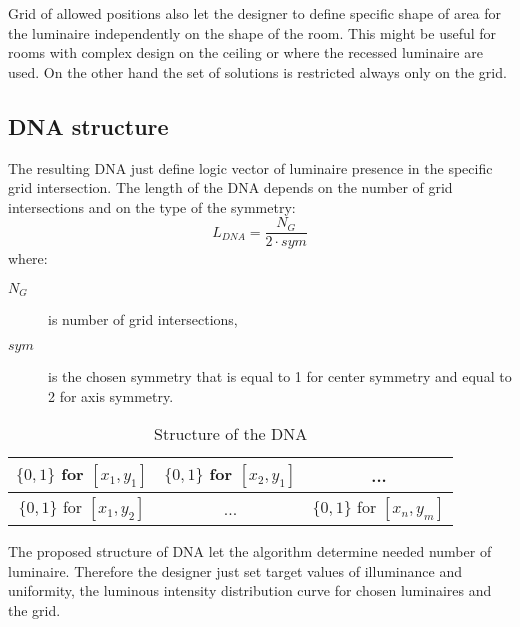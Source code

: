 Grid of allowed positions also let the designer to define specific shape of area for the luminaire independently on the shape of the room. This might be useful for rooms with complex design on the ceiling or where the recessed luminaire are used. On the other hand the set of solutions is restricted always only on the grid.

\subsection{DNA structure}
\label{ssec:dnaStruc}
The resulting DNA just define logic vector of luminaire presence in the specific grid intersection. The length of the DNA depends on the number of grid intersections and on the type of the symmetry:
\begin{equation}
\label{eq:DNALength}
L_{DNA} = \frac{N_G}{2\cdot sym}
\end{equation}
where:
\begin{description}
	\item[$N_G$] is number of grid intersections,
	\item[$sym$] is the chosen symmetry that is equal to 1 for center symmetry and equal to 2 for axis symmetry.
\end{description}

\begin{table}[htb]
	\renewcommand{\arraystretch}{1.3}
	\caption{Structure of the DNA}
 	\label{tab:onesideLamps}
	\centering
  \begin{tabular}{| c | c | c |}
    \hline
    $\lbrace0,1\rbrace$ for $[x_1,y_1]$ & $\lbrace0,1\rbrace$ for $[x_2,y_1]$ & ... \\
    \hline
    $\lbrace0,1\rbrace$ for $[x_1,y_2]$ & ... & $\lbrace0,1\rbrace$ for $[x_n,y_m]$ \\
    \hline
  \end{tabular}
\end{table}

The proposed structure of DNA let the algorithm determine needed number of luminaire. Therefore the designer just set target values of illuminance and uniformity, the luminous intensity distribution curve for chosen luminaires and the grid.